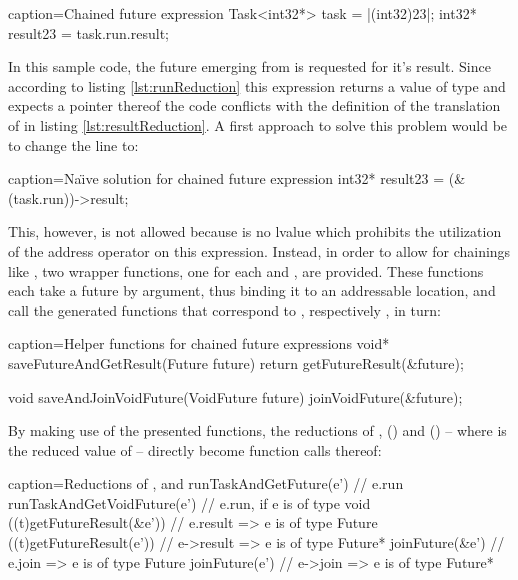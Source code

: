\begin{ccode}{caption=Chained future expression }
Task<int32*> task = |(int32)23|;
int32* result23 = task.run.result;
\end{ccode}

In this sample code, the future emerging from  is requested for it's result. Since according to listing \ref{lst:runReduction} this expression returns a value of type  and  expects a pointer thereof the code conflicts with the definition of the translation of  in listing \ref{lst:resultReduction}. A first approach to solve this problem would be to change the line to:

\begin{ccode}{caption=Na\"{\i}ve solution for chained future expression}
int32* result23 = (&(task.run))->result;
\end{ccode}

This, however, is not allowed because  is no lvalue \cite[pp.~147-148]{CPrimerPlus} which prohibits the utilization of the address operator on this expression. Instead, in order to allow for chainings like , two wrapper functions, one for each  and , are provided. These functions each take a future by argument, thus binding it to an addressable location, and call the generated functions that correspond to , respectively , in turn:
\begin{ccode}{caption=Helper functions for chained future expressions}
void* saveFutureAndGetResult(Future future) { 
  return getFutureResult(&future); 
}

void saveAndJoinVoidFuture(VoidFuture future) { 
  joinVoidFuture(&future); 
}
\end{ccode}

By making use of the presented functions, the reductions of ,  () and  () -- where  is the reduced value of  -- directly become function calls thereof:

\begin{ccode}{caption={Reductions of ,  and }}
runTaskAndGetFuture(e')        // e.run
runTaskAndGetVoidFuture(e')    // e.run, if e is of type void
((t)getFutureResult(&e'))      // e.result  => e is of type Future
((t)getFutureResult(e'))       // e->result => e is of type Future*
joinFuture(&e')                // e.join    => e is of type Future
joinFuture(e')                 // e->join   => e is of type Future*
\end{ccode}

